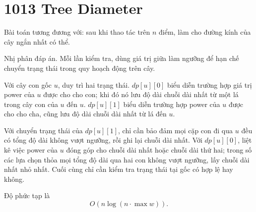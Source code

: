 \documentclass[11pt]{article}
\begin{document}
\section{1013 Tree Diameter}

Bài toán tương đương với: sau khi thao tác trên $n$ điểm, làm cho đường kính
của cây ngắn nhất có thể.

Nhị phân đáp án. Mỗi lần kiểm tra, dùng giá trị giữa làm ngưỡng để hạn chế
chuyển trạng thái trong quy hoạch động trên cây.

Với cây con gốc $u$, duy trì hai trạng thái. $dp[u][0]$ biểu diễn trường hợp
giá trị power của $u$ được cho cho con; khi đó nó lưu độ dài chuỗi dài nhất
từ một lá trong cây con của $u$ đến $u$. $dp[u][1]$ biểu diễn trường hợp
power của $u$ được cho cho cha, cũng lưu độ dài chuỗi dài nhất từ lá đến
$u$.

Với chuyển trạng thái của $dp[u][1]$, chỉ cần bảo đảm mọi cặp con đi qua
$u$ đều có tổng độ dài không vượt ngưỡng, rồi ghi lại chuỗi dài nhất. Với
$dp[u][0]$, liệt kê việc power của $u$ đóng góp cho chuỗi dài nhất hoặc chuỗi
dài thứ hai; trong số các lựa chọn thỏa mọi tổng độ dài qua hai con không
vượt ngưỡng, lấy chuỗi dài nhất nhỏ nhất. Cuối cùng chỉ cần kiểm tra trạng
thái tại gốc có hợp lệ hay không.

Độ phức tạp là
\[
  O(n\log(n\cdot \max w)).
\]
\end{document}
